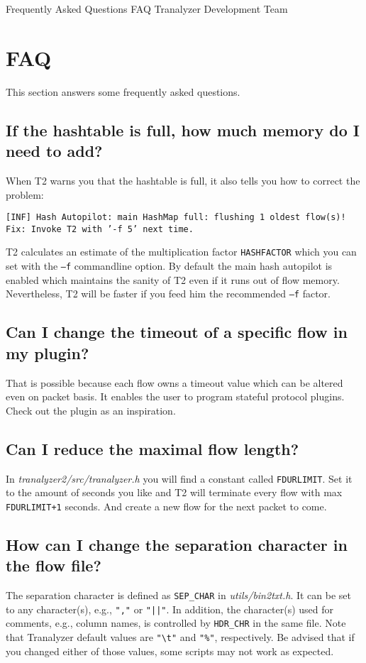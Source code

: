 \documentclass[documentation]{subfiles}
\begin{document}
\trantitle
    {Frequently Asked Questions}
    {FAQ} %
    {Tranalyzer Development Team} %

\section{FAQ}
This section answers some frequently asked questions.

\subsection{If the hashtable is full, how much memory do I need to add?}
When T2 warns you that the hashtable is full, it also tells you how to correct the problem:
\begin{center}
    {\tt [INF] Hash Autopilot: main HashMap full: flushing 1 oldest flow(s)! Fix: Invoke T2 with '-f 5' next time.}
\end{center}
T2 calculates an estimate of the multiplication factor {\tt HASHFACTOR} which you can set with the {\tt --f} commandline option.
By default the main hash autopilot is enabled which maintains the sanity of T2 even if it runs out of flow memory.
Nevertheless, T2 will be faster if you feed him the recommended {\tt --f} factor.

\subsection{Can I change the timeout of a specific flow in my plugin?}
That is possible because each flow owns a timeout value which can be altered even on packet basis.
It enables the user to program stateful protocol plugins.
Check out the  plugin as an inspiration.

\subsection{Can I reduce the maximal flow length?}
In {\em tranalyzer2/src/tranalyzer.h} you will find a constant called {\tt FDURLIMIT}.
Set it to the amount of seconds you like and T2 will terminate every flow with max {\tt FDURLIMIT+1} seconds.
And create a new flow for the next packet to come.

\subsection{How can I change the separation character in the flow file?}
The separation character is defined as {\tt SEP\_CHAR} in {\em utils/bin2txt.h}.
It can be set to any character(s), e.g., {\tt ","} or {\tt "||"}.
In addition, the character(s) used for comments, e.g., column names, is controlled by {\tt HDR\_CHR} in the same file.
Note that Tranalyzer default values are {\tt "\textbackslash{}t"} and {\tt "\%"}, respectively.
Be advised that if you changed either of those values, some scripts may not work as expected.
\end{document}
